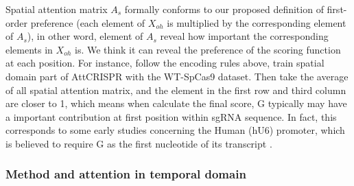 \documentclass{bioinfo}
\begin{document}
Spatial attention matrix $A_s$ formally conforms to our proposed definition of first-order preference (each element of $X_{oh}$ is multiplied by the corresponding element of $A_s$), 
in other word, element of $A_s$ reveal how important the corresponding elements in $X_{oh}$ is. 
We think it can reveal the preference of the scoring function at each position. 
For instance, follow the encoding rules above, train spatial domain part of AttCRISPR with the WT-SpCas9 dataset. 
Then take the average of all spatial attention matrix, and the element in the first row and third column are closer to 1, which means when calculate the final score, 
G typically may have a important contribution at first position within sgRNA sequence. 
In fact, this corresponds to some early studies concerning the Human (hU6) promoter, which is believed to require G as the first nucleotide of its transcript \citep{cong2013multiplex,jinek2012a,mali2013rnaguided}.
\subsubsection{Method and attention in temporal domain}
\end{document}
